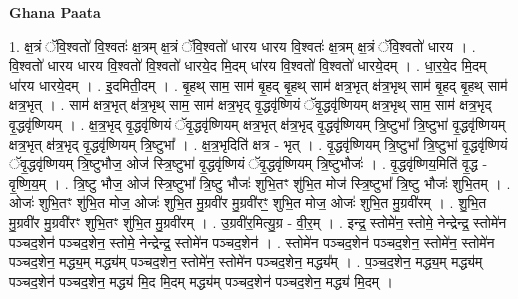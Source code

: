 \documentclass[17pt]{extarticle}
\begin{document}
\textbf{Ghana Paata } \newline

1. क्ष॒त्रं ॅवि॒श्वतो॑ वि॒श्वतः॑ क्ष॒त्रम् क्ष॒त्रं ॅवि॒श्वतो॑ धारय धारय वि॒श्वतः॑ क्ष॒त्रम् क्ष॒त्रं ॅवि॒श्वतो॑ धारय । . वि॒श्वतो॑ धारय धारय वि॒श्वतो॑ वि॒श्वतो॑ धारये॒द मि॒दम् धा॑रय वि॒श्वतो॑ वि॒श्वतो॑ धारये॒दम् । . धा॒र॒ये॒द मि॒दम् धा॑रय धारये॒दम् । . इ॒दमिती॒दम् । . बृ॒हथ् साम॒ साम॑ बृ॒हद् बृ॒हथ् साम॑ क्षत्र॒भृत् क्ष॑त्र॒भृथ् साम॑ बृ॒हद् बृ॒हथ् साम॑ क्षत्र॒भृत् । . साम॑ क्षत्र॒भृत् क्ष॑त्र॒भृथ् साम॒ साम॑ क्षत्र॒भृद् वृ॒द्धवृ॑ष्णियं ॅवृ॒द्धवृ॑ष्णियम् क्षत्र॒भृथ् साम॒ साम॑ क्षत्र॒भृद् वृ॒द्धवृ॑ष्णियम् । . क्ष॒त्र॒भृद् वृ॒द्धवृ॑ष्णियं ॅवृ॒द्धवृ॑ष्णियम् क्षत्र॒भृत् क्ष॑त्र॒भृद् वृ॒द्धवृ॑ष्णियम् त्रि॒ष्टुभा᳚ त्रि॒ष्टुभा॑ वृ॒द्धवृ॑ष्णियम् क्षत्र॒भृत् क्ष॑त्र॒भृद् वृ॒द्धवृ॑ष्णियम् त्रि॒ष्टुभा᳚ । . क्ष॒त्र॒भृदिति॑ क्षत्र - भृत् । . वृ॒द्धवृ॑ष्णियम् त्रि॒ष्टुभा᳚ त्रि॒ष्टुभा॑ वृ॒द्धवृ॑ष्णियं ॅवृ॒द्धवृ॑ष्णियम् त्रि॒ष्टुभौज॒ ओज॑ स्त्रि॒ष्टुभा॑ वृ॒द्धवृ॑ष्णियं ॅवृ॒द्धवृ॑ष्णियम् त्रि॒ष्टुभौजः॑ । . वृ॒द्धवृ॑ष्णिय॒मिति॑ वृ॒द्ध - वृ॒ष्णि॒य॒म् । . त्रि॒ष्टु भौज॒ ओज॑ स्त्रि॒ष्टुभा᳚ त्रि॒ष्टु भौजः॑ शुभि॒तꣳ शु॑भि॒त मोज॑ स्त्रि॒ष्टुभा᳚ त्रि॒ष्टु भौजः॑ शुभि॒तम् । . ओजः॑ शुभि॒तꣳ शु॑भि॒त मोज॒ ओजः॑ शुभि॒त मु॒ग्रवी॑र मु॒ग्रवी॑रꣳ॒॒ शुभि॒त मोज॒ ओजः॑ शुभि॒त मु॒ग्रवी॑रम् । . शु॒भि॒त मु॒ग्रवी॑र मु॒ग्रवी॑रꣳ शुभि॒तꣳ शु॑भि॒त मु॒ग्रवी॑रम् । . उ॒ग्रवी॑र॒मित्यु॒ग्र - वी॒र॒म् । . इन्द्र॒ स्तोमे॑न॒ स्तोमे॒ नेन्द्रेन्द्र॒ स्तोमे॑न पञ्चद॒शेन॑ पञ्चद॒शेन॒ स्तोमे॒ नेन्द्रेन्द्र॒ स्तोमे॑न पञ्चद॒शेन॑ । . स्तोमे॑न पञ्चद॒शेन॑ पञ्चद॒शेन॒ स्तोमे॑न॒ स्तोमे॑न पञ्चद॒शेन॒ मद्ध्य॒म् मद्ध्य॑म् पञ्चद॒शेन॒ स्तोमे॑न॒ स्तोमे॑न पञ्चद॒शेन॒ मद्ध्य᳚म् । . प॒ञ्च॒द॒शेन॒ मद्ध्य॒म् मद्ध्य॑म् पञ्चद॒शेन॑ पञ्चद॒शेन॒ मद्ध्य॑ मि॒द मि॒दम् मद्ध्य॑म् पञ्चद॒शेन॑ पञ्चद॒शेन॒ मद्ध्य॑ मि॒दम् । \newline
\end{document}
